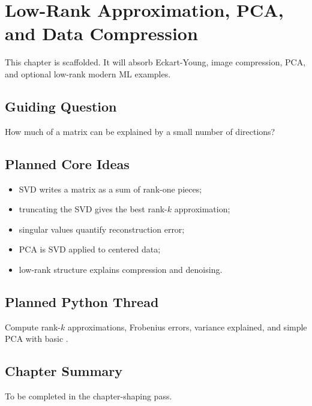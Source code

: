 \chapter{Low-Rank Approximation, PCA, and Data Compression}
\label{ch:low-rank-pca}

\begin{draftbox}
This chapter is scaffolded. It will absorb Eckart-Young, image compression,
PCA, and optional low-rank modern ML examples.
\end{draftbox}

\section{Guiding Question}

How much of a matrix can be explained by a small number of directions?

\section{Planned Core Ideas}

\begin{itemize}
  \item SVD writes a matrix as a sum of rank-one pieces;
  \item truncating the SVD gives the best rank-$k$ approximation;
  \item singular values quantify reconstruction error;
  \item PCA is SVD applied to centered data;
  \item low-rank structure explains compression and denoising.
\end{itemize}

\section{Planned Python Thread}

Compute rank-$k$ approximations, Frobenius errors, variance explained, and
simple PCA with basic \NumPy.

\section*{Chapter Summary}

To be completed in the chapter-shaping pass.


